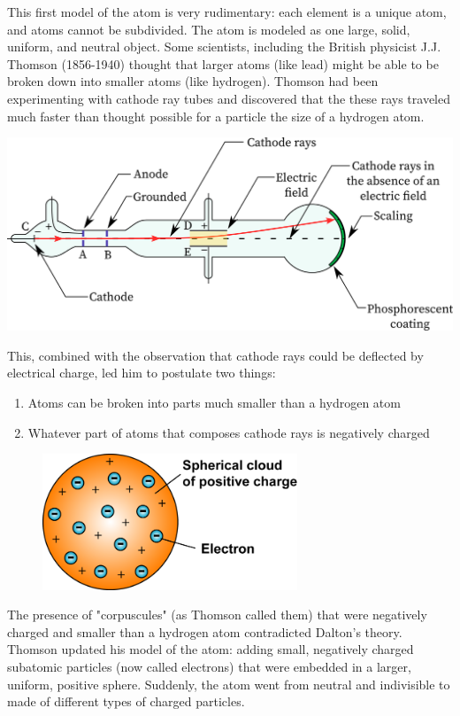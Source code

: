 This first model of the atom is very rudimentary: each element is a unique atom,
and atoms cannot be subdivided. The atom is modeled as one large, solid, uniform,
and neutral object. Some scientists, including the British physicist J.J. Thomson
(1856-1940) thought that larger atoms (like lead) might be able to be broken down
into smaller atoms (like hydrogen). Thomson had been experimenting with cathode
ray tubes and discovered that the these rays traveled much faster than thought
possible for a particle the size of a hydrogen atom.

\includegraphics[width=1\textwidth]{cathode-ray-tube.png}

This, combined with the observation that cathode rays could be deflected by
electrical charge, led him to postulate two things:

\begin{enumerate}
\item Atoms can be broken into parts much smaller than a hydrogen atom
\item Whatever part of atoms that composes cathode rays is negatively charged
\end{enumerate}

\begin{figure}
\noindent\includegraphics[width=3in]{thomson_model.png}
\end{figure}

The presence of "corpuscules" (as Thomson called them) that were negatively
charged and smaller than a hydrogen atom contradicted Dalton's theory. Thomson
updated his model of the atom: adding small, negatively charged subatomic
particles (now called electrons) that were embedded in a larger, uniform, positive
sphere. Suddenly, the atom went from neutral and indivisible to made of different
types of charged particles.

